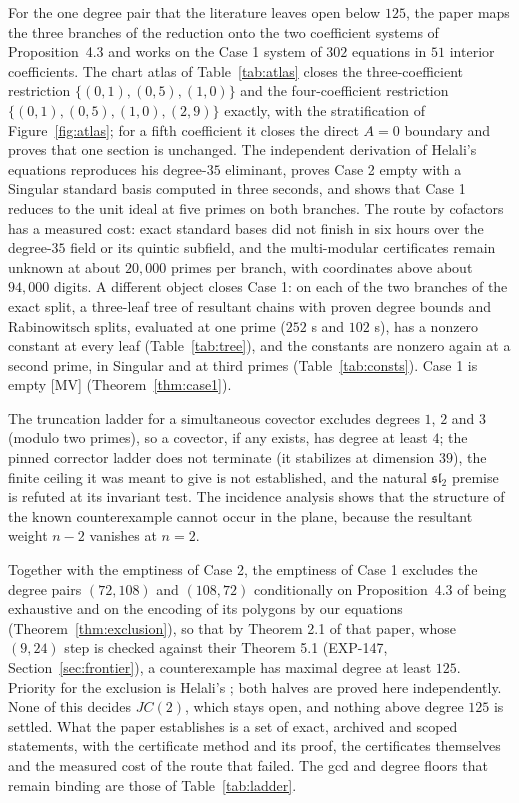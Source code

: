 \documentclass[11pt]{article}
\theoremstyle{remark}
\begin{document}
For the one degree pair that the literature leaves open below $125$, the paper maps the three branches of the reduction onto the two coefficient systems of Proposition~4.3 and works on the Case 1 system of $302$
equations in $51$ interior coefficients. The chart atlas of Table~\ref{tab:atlas} closes the three-coefficient restriction $\{(0,1),(0,5),(1,0)\}$ and the four-coefficient restriction $\{(0,1),(0,5),(1,0),(2,9)\}$ exactly, with the
stratification of Figure~\ref{fig:atlas}; for a fifth coefficient it closes the direct $A=0$ boundary and proves that one section is unchanged. The independent derivation of Helali's equations reproduces his degree-$35$ eliminant,
proves Case 2 empty with a Singular standard basis computed in three seconds, and shows that Case 1 reduces to the unit ideal at five primes on both branches. The route by cofactors has a measured cost: exact
standard bases did not finish in six hours over the degree-$35$ field or its quintic subfield, and the multi-modular certificates remain unknown at about $20{,}000$ primes per branch, with coordinates above about $94{,}000$ digits.
A different object closes Case 1: on each of the two branches of the exact split, a three-leaf tree of resultant chains with proven degree bounds and Rabinowitsch splits, evaluated at one prime ($252$ s and $102$ s), has a nonzero constant at every leaf (Table~\ref{tab:tree}),
and the constants are nonzero again at a second prime, in Singular and at third primes (Table~\ref{tab:consts}). Case 1 is empty [MV] (Theorem~\ref{thm:case1}).

The truncation ladder for a simultaneous covector excludes degrees $1$, $2$ and $3$ (modulo two primes), so a covector, if any exists, has degree at least $4$; the pinned corrector ladder does not terminate (it
stabilizes at dimension $39$), the finite ceiling it was meant to give is not established, and the natural $\mathfrak{sl}_2$ premise is refuted at its invariant test. The incidence analysis shows that the structure of the known
counterexample cannot occur in the plane, because the resultant weight $n-2$ vanishes at $n=2$.

Together with the emptiness of Case 2, the emptiness of Case 1 excludes the degree pairs $(72,108)$ and $(108,72)$ conditionally on Proposition~4.3 of \cite{GGHV2022} being exhaustive and on the encoding of its polygons by our equations (Theorem~\ref{thm:exclusion}), so that by Theorem 2.1 of that paper, whose $(9,24)$ step is checked against their Theorem 5.1 (EXP-147, Section~\ref{sec:frontier}), a counterexample has
maximal degree at least $125$. Priority for the exclusion is Helali's \cite{Helali2026}; both halves are proved here independently. None of this decides $JC(2)$, which stays open, and nothing above degree $125$ is settled.
What the paper establishes is a set of exact, archived and scoped statements, with the certificate method and its proof, the certificates themselves and the measured cost of the route that failed. The gcd and degree floors that remain
binding are those of Table~\ref{tab:ladder}.
\end{document}
